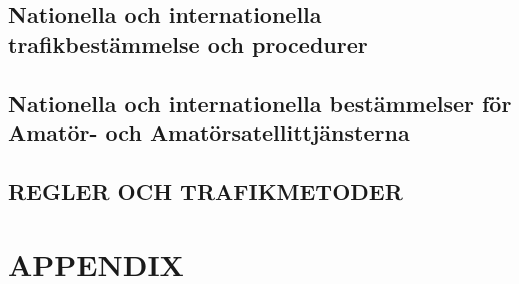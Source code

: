 \documentclass[a4paper,twoside,twocolumn,openright]{book}
\begin{document}


\chapter{Nationella och internationella trafikbestämmelse och procedurer}







\chapter{Nationella och internationella bestämmelser för Amatör- och
  Amatörsatellittjänsterna}




\chapter{REGLER OCH TRAFIKMETODER}


\appendix
\part{APPENDIX}













\listoffigures
\listoftables

\backmatter

\printindex
\end{document}
